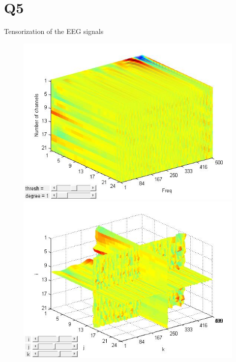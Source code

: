 \documentclass[t,12pt,english
\ifx\beamermode\undefined\else,\beamermode\fi
]{beamer}
\begin{document}
\section{Q5}

\begin{frame}{Tensorization of the EEG signals}

\begin{figure}[!htbp]
%
\centering
\includegraphics[width=1\textwidth]{15.jpg}
\endminipage\hfill
{}%
\centering
\includegraphics[width=1\textwidth]{16.jpg}
\endminipage\hfill
{}%
\centering

\end{figure}
\end{frame}
\end{document}
